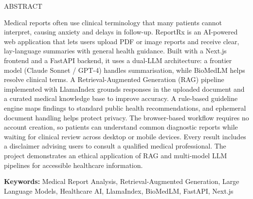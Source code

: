\setcounter{page}{4}
\thispagestyle{plain}

{\abstracttitlefont ABSTRACT}
\vspace{24pt}  %

\noindent\begin{minipage}{0.95\textwidth}
\justifying
\abstracttextfont
Medical reports often use clinical terminology that many patients cannot interpret, causing anxiety and delays in follow-up. ReportRx is an AI-powered web application that lets users upload PDF or image reports and receive clear, lay-language summaries with general health guidance. Built with a Next.js frontend and a FastAPI backend, it uses a dual-LLM architecture: a frontier model (Claude Sonnet / GPT-4) handles summarisation, while BioMedLM helps resolve clinical terms. A Retrieval-Augmented Generation (RAG) pipeline implemented with LlamaIndex grounds responses in the uploaded document and a curated medical knowledge base to improve accuracy. A rule-based guideline engine maps findings to standard public health recommendations, and ephemeral document handling helps protect privacy. The browser-based workflow requires no account creation, so patients can understand common diagnostic reports while waiting for clinical review across desktop or mobile devices. Every result includes a disclaimer advising users to consult a qualified medical professional. The project demonstrates an ethical application of RAG and multi-model LLM pipelines for accessible healthcare information.

\vspace{12pt}
\noindent\textbf{Keywords:} Medical Report Analysis, Retrieval-Augmented Generation, Large Language Models, Healthcare AI, LlamaIndex, BioMedLM, FastAPI, Next.js
\end{minipage}
